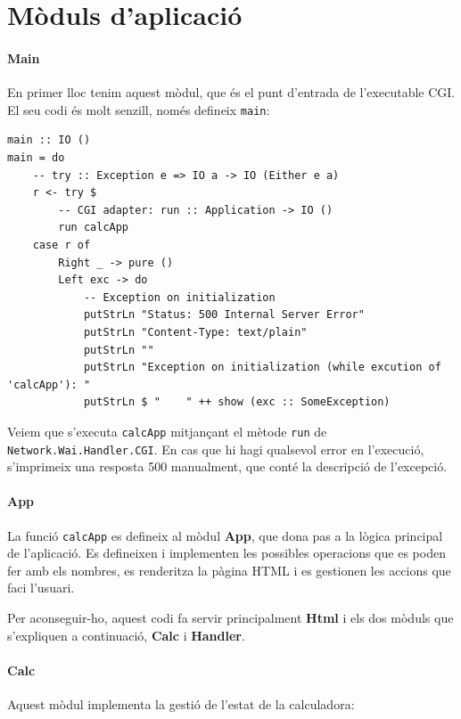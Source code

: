 \documentclass[catalan, a4paper]{scrartcl}
\begin{document}
\section{Mòduls d'aplicació}

\paragraph{Main} En primer lloc tenim aquest mòdul, que és el punt d'entrada
de l'executable CGI. El seu codi és molt senzill, només defineix \texttt{main}:

\begin{verbatim}
main :: IO ()
main = do
    -- try :: Exception e => IO a -> IO (Either e a)
    r <- try $
        -- CGI adapter: run :: Application -> IO ()
        run calcApp
    case r of
        Right _ -> pure ()
        Left exc -> do
            -- Exception on initialization
            putStrLn "Status: 500 Internal Server Error"
            putStrLn "Content-Type: text/plain"
            putStrLn ""
            putStrLn "Exception on initialization (while excution of 'calcApp'): "
            putStrLn $ "    " ++ show (exc :: SomeException)  
\end{verbatim}

Veiem que s'executa \texttt{calcApp} mitjançant
el mètode \texttt{run} de \texttt{Network.Wai.Handler.CGI}.
En cas que hi hagi qualsevol error en l'execució, s'imprimeix una resposta
500 manualment, que conté la descripció de l'excepció.

\paragraph{App} La funció \texttt{calcApp} es defineix al mòdul \textbf{App},
que dona pas a la lògica principal de l'aplicació. Es defineixen i implementen
les possibles operacions que es poden fer amb els nombres, es renderitza la
pàgina HTML i es gestionen les accions que faci l'usuari.

Per aconseguir-ho, aquest codi fa servir principalment \textbf{Html} i els dos mòduls
que s'expliquen a continuació, \textbf{Calc} i \textbf{Handler}.

\paragraph{Calc} Aquest mòdul implementa la gestió de l'estat de la
calculadora:
\end{document}
